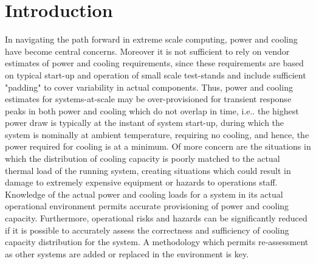 \section{Introduction}

In navigating the path forward in extreme scale computing, power and
cooling have become central concerns. Moreover it is not sufficient to
rely on vendor estimates of power and cooling requirements, since these
requirements are based on typical start-up and operation of small scale
test-stands and include sufficient "padding" to cover variability in
actual components. Thus, power and cooling estimates for systems-at-scale
may be over-provisioned for transient response peaks in both power and
cooling which do not overlap in time, i.e.. the highest power draw is
typically at the instant of system start-up, during which the system
is nominally at ambient temperature, requiring no cooling, and hence,
the power required for cooling is at a minimum. Of more concern are the
situations in which the distribution of cooling capacity is poorly matched
to the actual thermal load of the running system, creating situations
which could result in damage to extremely expensive equipment or hazards
to operations staff. Knowledge of the actual power and cooling loads
for a system in its actual operational environment permits accurate
provisioning of power and cooling capacity. Furthermore, operational
risks and hazards can be significantly reduced if it is possible to
accurately assess the correctness and sufficiency of cooling capacity
distribution for the system. A methodology which permits re-assessment
as other systems are added or replaced in the environment is key.

